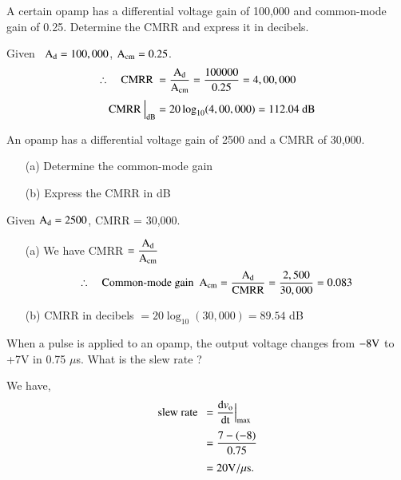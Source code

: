 \begin{problem}\label{prob4.6}
A certain opamp has a differential voltage gain of 100,000 and common-mode gain of 0.25. Determine the CMRR and express it in decibels.
\end{problem}

\begin{solution}
Given~ $\textrm{A}_{\text{d}}=100,000$, $\textrm{A}_{\text{cm}}=0.25$.
\begin{align*}
\therefore\quad \text{CMRR~} &= \frac{\textrm{A}_{\text{d}}}{\textrm{A}_{\text{cm}}}=\frac{100000}{0.25}=4,00,000\\[3pt]
\text{CMRR~}\Big|_{\text{dB}} &= 20 \log_{10}(4,00,000)=112.04\text{~dB}
\end{align*}
\end{solution}

\begin{problem}\label{prob4.7}
An opamp has a differential voltage gain of 2500 and a CMRR of 30,000.
\begin{itemize}
\item[(a)] Determine the common-mode gain

\item[(b)] Express the CMRR in dB
\end{itemize}
\end{problem}

\begin{solution}
Given $\textrm{A}_{\text{d}}=2500$, CMRR = 30,000.
\begin{itemize}
\item[(a)] We have CMRR $=\dfrac{\textrm{A}_{\text{d}}}{\textrm{A}_{\text{cm}}}$
$$
\therefore\quad \text{Common-mode gain~~} \textrm{A}_{\text{cm}}=\frac{\textrm{A}_{\text{d}}}{\text{CMRR}}=\frac{2,500}{30,000}=0.083
$$

\item[(b)] CMRR in decibels $=20\log_{10}(30,000)=89.54$ dB
\end{itemize}
\end{solution}

\begin{problem}\label{prob4.8}
When a pulse is applied to an opamp, the output voltage changes from $-8\textrm{V}$ to +7V in 0.75 $\mu$s. What is the slew rate ?
\end{problem}

\begin{solution}
We have,
\begin{align*}
\text{slew rate~~} &= \frac{\text{d}v_{\textrm{o}}}{\text{dt}}\Big|_{\max}\\[3pt]
&= \frac{7-(-8)}{0.75}\\[3pt]
&= 20\textrm{V}/\mu\text{s}.
\end{align*}
\end{solution}

